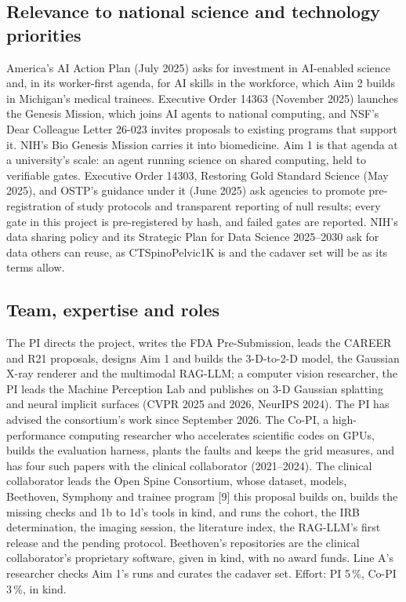 \documentclass[10pt,letterpaper]{article}
\newcommand{\pct}{\,\%}
\begin{document}
\subsection*{Relevance to national science and technology priorities}
America's AI Action Plan (July 2025) asks for investment in AI-enabled science and, in its worker-first agenda, for
AI skills in the workforce, which Aim 2 builds in Michigan's medical trainees. Executive Order 14363 (November 2025)
launches the Genesis Mission, which joins AI agents to national computing, and NSF's Dear Colleague Letter 26-023
invites proposals to existing programs that support it. NIH's Bio Genesis Mission carries it into biomedicine. Aim 1 is
that agenda at a university's scale: an agent running science on shared computing, held to verifiable gates.
Executive Order 14303, Restoring Gold Standard Science (May 2025), and OSTP's guidance under it (June 2025) ask
agencies to promote pre-registration of study protocols and transparent reporting of null results; every gate in this
project is pre-registered by hash, and failed gates are reported. NIH's data sharing policy and its Strategic Plan for
Data Science 2025--2030 ask for data others can reuse, as CTSpinoPelvic1K is and the cadaver set will be as its
terms allow.

\subsection*{Team, expertise and roles}
The PI directs the project, writes the FDA Pre-Submission, leads the CAREER and R21 proposals, designs Aim 1
and builds the 3-D-to-2-D model, the Gaussian X-ray renderer and the multimodal RAG-LLM;
a computer vision researcher, the PI leads the Machine Perception Lab and publishes on
3-D Gaussian splatting and neural implicit surfaces (CVPR 2025 and 2026, NeurIPS 2024). The PI has advised the consortium's work since September 2026. The
Co-PI, a high-performance computing researcher who accelerates scientific codes on GPUs, builds the evaluation harness,
plants the faults and keeps the grid measures, and has four such papers with the clinical collaborator
(2021--2024). The clinical collaborator leads the Open Spine
Consortium, whose dataset, models, Beethoven, Symphony and trainee program [9] this proposal builds on, builds the
missing checks and 1b to 1d's tools in kind, and runs the cohort, the IRB determination, the imaging session, the literature index, the RAG-LLM's first release and the pending protocol. Beethoven's repositories are the clinical collaborator's proprietary software, given in kind, with no award funds. Line A's researcher checks Aim 1's runs and curates the cadaver set. Effort: PI 5\pct{}, Co-PI 3\pct{}, in kind.
\end{document}
